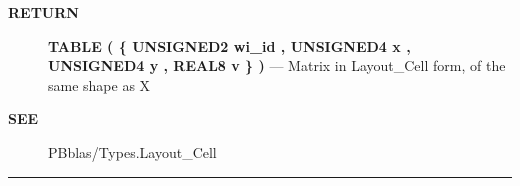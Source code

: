 \par
\begin{description}
\item [\colorbox{tagtype}{\color{white} \textbf{\textsf{RETURN}}}] \textbf{TABLE ( \{ UNSIGNED2 wi\_id , UNSIGNED4 x , UNSIGNED4 y , REAL8 v \} )} --- Matrix in Layout\_Cell form, of the same shape as X
\end{description}







\par
\begin{description}
\item [\colorbox{tagtype}{\color{white} \textbf{\textsf{SEE}}}] PBblas/Types.Layout\_Cell
\end{description}



\rule{\linewidth}{0.5pt}
